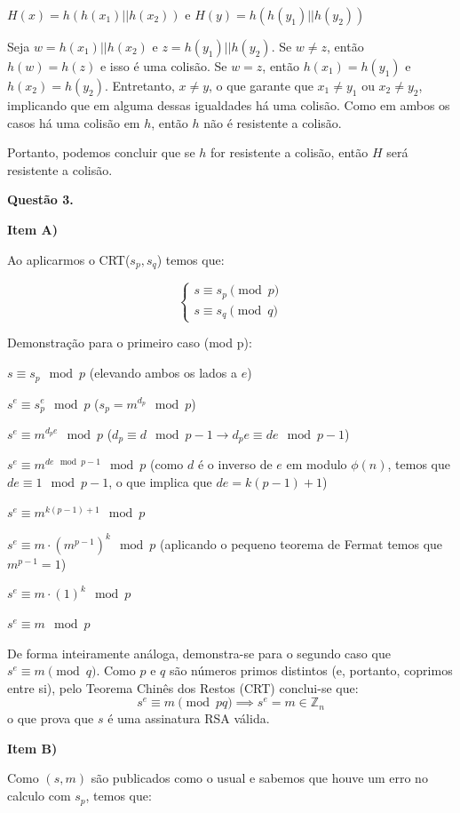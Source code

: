 \documentclass{article}
\begin{document}
$H(x) = h(h(x_1) || h(x_2))$ e $H(y) = h(h(y_1) || h(y_2))$

Seja $w = h(x_1) || h(x_2)$ e $z = h(y_1) || h(y_2)$. Se $w \neq z$, então $h(w) = h(z)$ e isso é uma colisão. Se $w = z$, então $h(x_1) = h(y_1)$ e $h(x_2) = h(y_2)$. Entretanto, $x \neq y$, o que garante que $x_1 \neq y_1$ ou $x_2 \neq y_2$, implicando que em alguma dessas igualdades há uma colisão. Como em ambos os casos há uma colisão em $h$, então $h$ não é resistente a colisão.

Portanto, podemos concluir que se $h$ for resistente a colisão, então $H$ será resistente a colisão.

\textbf{Questão 3.}

\textbf{Item A)}

Ao aplicarmos o CRT($s_p, s_q$) temos que:

\[
        \begin{cases}
                s \equiv s_p \pmod p \\
                s \equiv s_q \pmod q
        \end{cases}
\]

Demonstração para o primeiro caso (mod p):

$s \equiv s_p \mod p$ (elevando ambos os lados a $e$)

$s^e \equiv s_p^e \mod p$ ($s_p = m^{d_p} \mod p$)

$s^e \equiv m^{d_p e} \mod p$ ($d_p \equiv d \mod p-1 \rightarrow d_p e \equiv d e \mod p-1$)

$s^e \equiv m^{de\mod p-1} \mod p$ (como $d$ é o inverso de $e$ em modulo $\phi(n)$, temos que $de \equiv 1 \mod p-1$, o que implica que $de = k(p-1) + 1$)

$s^e \equiv m^{k(p-1) + 1} \mod p$

$s^e \equiv m \cdot (m^{p-1})^k \mod p$ (aplicando o pequeno teorema de Fermat temos que $m^{p-1} = 1$)

$s^e \equiv m \cdot (1)^k  \mod p$

$s^e \equiv m \mod p$

De forma inteiramente análoga, demonstra-se para o segundo caso que $s^e \equiv m \pmod q$. Como $p$ e $q$ são números primos distintos (e, portanto, coprimos entre si), pelo Teorema Chinês dos Restos (CRT) conclui-se que:$$s^e \equiv m \pmod{pq} \implies s^e = m \in \mathbb{Z}_n$$o que prova que $s$ é uma assinatura RSA válida.

\textbf{Item B)}

Como $(s,m)$ são publicados como o usual e sabemos que houve um erro no calculo com $s_p$, temos que:
\end{document}
